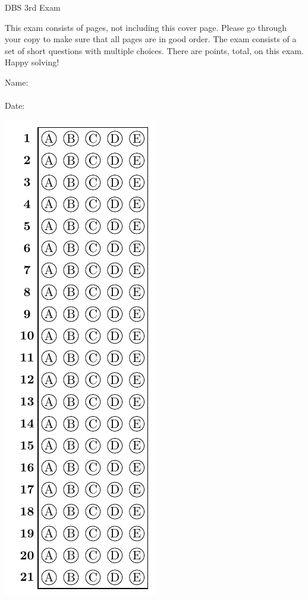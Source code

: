 \documentclass[11pt, addpoints]{exam}\usepackage[utf8]{inputenc}
\begin{document}
	
	\begin{coverpages}
		\begin{center}
			\begin{Large}
				\vspace{-5mm}
				DBS 3rd Exam
			\end{Large}
		\end{center}
		\vspace{5mm}

		\begin{MyBox}
			This exam consists of \numpages{} pages, not including this cover page.  Please go through your copy to make sure that all pages are in good order.  The exam consists of a set of short questions with multiple choices. There are \numpoints{} points, total, on this exam. \\
			Happy solving!
		\end{MyBox}

		\vspace{10mm}
		\noindent
		Name:\enspace\hrulefill \\
		\\
		Date:\enspace\hrulefill
		\vspace{5mm}
		\begin{center}
			\includegraphics{../answer_table}


\end{center}
\end{coverpages}
\end{document}
